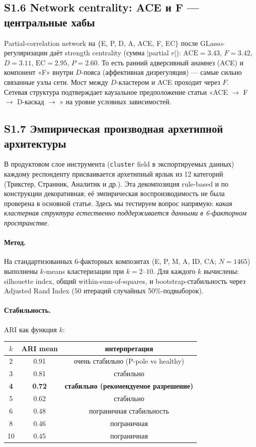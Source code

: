 \subsection*{S1.6 Network centrality: ACE и F --- центральные хабы}
Partial-correlation network на $\{$E, P, D, A, ACE, F, EC$\}$ после GLasso-регуляризации даёт strength centrality (сумма $|$partial $r|$): $\mathrm{ACE} = 3.43$, $F = 3.42$, $D = 3.11$, $\mathrm{EC} = 2.95$, $P = 2.60$. То есть ранний адверсивный анамнез (ACE) и компонент «F» внутри $D$-пояса (аффективная дизрегуляция) --- самые сильно связанные узлы сети. Мост между $D$-кластером и ACE проходит через $F$. Сетевая структура подтверждает каузальное предположение статьи «ACE $\to$ F $\to$ D-каскад $\to$ \EAF{}» на уровне условных зависимостей.

\subsection*{S1.7 Эмпирическая производная архетипной архитектуры}
\label{supp:empirical_archetypes}

В продуктовом слое инструмента (\texttt{cluster} field в экспортируемых данных) каждому респонденту присваивается архетипный ярлык из 12 категорий (Трикстер, Странник, Аналитик и др.). Эта декомпозиция rule-based и по конструкции декоративная; её эмпирическая воспроизводимость не была проверена в основной статье. Здесь мы тестируем вопрос напрямую: \emph{какая кластерная структура естественно поддерживается данными в 6-факторном пространстве}.

\paragraph{Метод.} На стандартизованных 6-факторных композитах (E, P, M, A, ID, CA; $N = 1465$) выполнены $k$-means кластеризации при $k = 2$--$10$. Для каждого $k$ вычислены: silhouette index, общий within-sum-of-squares, и bootstrap-стабильность через Adjusted Rand Index ($50$ итераций случайных 50\%-подвыборок).

\paragraph{Стабильность.} ARI как функция $k$:

\begin{center}
\begin{tabular}{ccc}
\toprule
$k$ & ARI mean & интерпретация \\
\midrule
2 & 0.91 & очень стабильно (P-pole vs healthy) \\
3 & 0.81 & стабильно \\
\textbf{4} & \textbf{0.72} & \textbf{стабильно (рекомендуемое разрешение)} \\
5 & 0.62 & стабильно \\
6 & 0.48 & пограничная стабильность \\
8 & 0.46 & пограничная \\
10 & 0.45 & пограничная \\
\bottomrule
\end{tabular}
\end{center}

